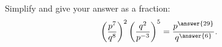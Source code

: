 \documentclass{ximera}
\author{Ivo Terek}
\begin{document}
\begin{exercise}

  Simplify and give your answer as a fraction: $$\left(\frac{p^7}{q^8}\right)^2\left(\frac{q^2}{p^{-3}}\right)^5 = \frac{p^{\answer{29}}}{q^{\answer{6}}}.$$

\end{exercise}
\end{document}
